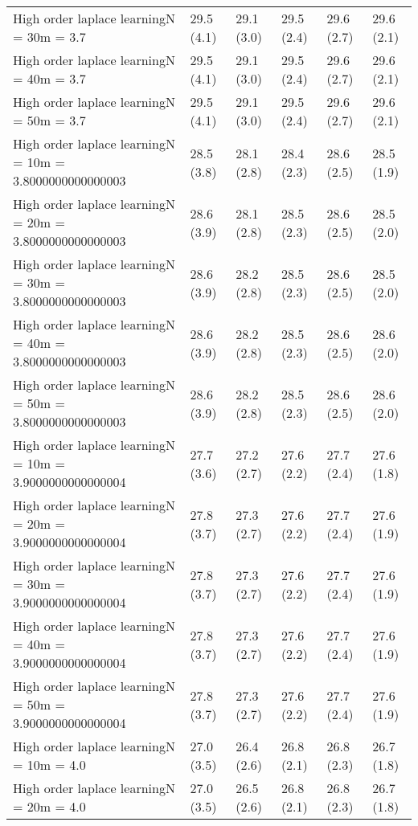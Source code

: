 \documentclass{article}
\begin{document}
\begin{table*}[t!]
\begin{center}
\begin{small}
\begin{sc}
\begin{tabular}{llllll}
High order laplace learningN = 30m = 3.7&29.5 (4.1)      &29.1 (3.0)      &29.5 (2.4)      &29.6 (2.7)      &29.6 (2.1)      \\
High order laplace learningN = 40m = 3.7&29.5 (4.1)      &29.1 (3.0)      &29.5 (2.4)      &29.6 (2.7)      &29.6 (2.1)      \\
High order laplace learningN = 50m = 3.7&29.5 (4.1)      &29.1 (3.0)      &29.5 (2.4)      &29.6 (2.7)      &29.6 (2.1)      \\
High order laplace learningN = 10m = 3.8000000000000003&28.5 (3.8)      &28.1 (2.8)      &28.4 (2.3)      &28.6 (2.5)      &28.5 (1.9)      \\
High order laplace learningN = 20m = 3.8000000000000003&28.6 (3.9)      &28.1 (2.8)      &28.5 (2.3)      &28.6 (2.5)      &28.5 (2.0)      \\
High order laplace learningN = 30m = 3.8000000000000003&28.6 (3.9)      &28.2 (2.8)      &28.5 (2.3)      &28.6 (2.5)      &28.5 (2.0)      \\
High order laplace learningN = 40m = 3.8000000000000003&28.6 (3.9)      &28.2 (2.8)      &28.5 (2.3)      &28.6 (2.5)      &28.6 (2.0)      \\
High order laplace learningN = 50m = 3.8000000000000003&28.6 (3.9)      &28.2 (2.8)      &28.5 (2.3)      &28.6 (2.5)      &28.6 (2.0)      \\
High order laplace learningN = 10m = 3.9000000000000004&27.7 (3.6)      &27.2 (2.7)      &27.6 (2.2)      &27.7 (2.4)      &27.6 (1.8)      \\
High order laplace learningN = 20m = 3.9000000000000004&27.8 (3.7)      &27.3 (2.7)      &27.6 (2.2)      &27.7 (2.4)      &27.6 (1.9)      \\
High order laplace learningN = 30m = 3.9000000000000004&27.8 (3.7)      &27.3 (2.7)      &27.6 (2.2)      &27.7 (2.4)      &27.6 (1.9)      \\
High order laplace learningN = 40m = 3.9000000000000004&27.8 (3.7)      &27.3 (2.7)      &27.6 (2.2)      &27.7 (2.4)      &27.6 (1.9)      \\
High order laplace learningN = 50m = 3.9000000000000004&27.8 (3.7)      &27.3 (2.7)      &27.6 (2.2)      &27.7 (2.4)      &27.6 (1.9)      \\
High order laplace learningN = 10m = 4.0&27.0 (3.5)      &26.4 (2.6)      &26.8 (2.1)      &26.8 (2.3)      &26.7 (1.8)      \\
High order laplace learningN = 20m = 4.0&27.0 (3.5)      &26.5 (2.6)      &26.8 (2.1)      &26.8 (2.3)      &26.7 (1.8)      \\

\end{tabular}
\end{sc}
\end{small}
\end{center}
\end{table*}
\end{document}
